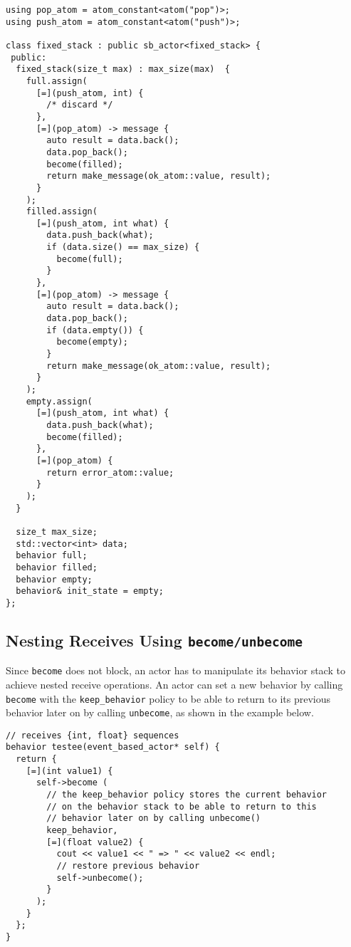 \clearpage
\begin{lstlisting}
using pop_atom = atom_constant<atom("pop")>;
using push_atom = atom_constant<atom("push")>;

class fixed_stack : public sb_actor<fixed_stack> {
 public:
  fixed_stack(size_t max) : max_size(max)  {
    full.assign(
      [=](push_atom, int) {
        /* discard */
      },
      [=](pop_atom) -> message {
        auto result = data.back();
        data.pop_back();
        become(filled);
        return make_message(ok_atom::value, result);
      }
    );
    filled.assign(
      [=](push_atom, int what) {
        data.push_back(what);
        if (data.size() == max_size) {
          become(full);
        }
      },
      [=](pop_atom) -> message {
        auto result = data.back();
        data.pop_back();
        if (data.empty()) {
          become(empty);
        }
        return make_message(ok_atom::value, result);
      }
    );
    empty.assign(
      [=](push_atom, int what) {
        data.push_back(what);
        become(filled);
      },
      [=](pop_atom) {
        return error_atom::value;
      }
    );
  }

  size_t max_size;
  std::vector<int> data;
  behavior full;
  behavior filled;
  behavior empty;
  behavior& init_state = empty;
};
\end{lstlisting}

\clearpage
\subsection{Nesting Receives Using \lstinline^become/unbecome^}

Since \lstinline^become^ does not block, an actor has to manipulate its behavior stack to achieve nested receive operations.
An actor can set a new behavior by calling \lstinline^become^ with the \lstinline^keep_behavior^ policy to be able to return to its previous behavior later on by calling \lstinline^unbecome^, as shown in the example below.

\begin{lstlisting}
// receives {int, float} sequences
behavior testee(event_based_actor* self) {
  return {
    [=](int value1) {
      self->become (
        // the keep_behavior policy stores the current behavior
        // on the behavior stack to be able to return to this
        // behavior later on by calling unbecome()
        keep_behavior,
        [=](float value2) {
          cout << value1 << " => " << value2 << endl;
          // restore previous behavior
          self->unbecome();
        }
      );
    }
  };
}
\end{lstlisting}

